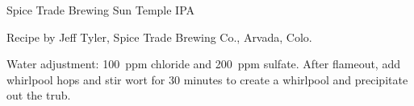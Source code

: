 \begin{recipe}{Spice Trade Brewing Sun Temple IPA}

\begin{aboutblock}
Recipe by Jeff Tyler, Spice Trade Brewing Co., Arvada, Colo.
\end{aboutblock}


\begin{methodandtiming}
 
\begin{mashsteps}
\end{mashsteps}

\begin{fermentationsteps}
\end{fermentationsteps}

\begin{directions}
Water adjustment: 100~ppm chloride and 200~ppm sulfate. After flameout,
add whirlpool hops and stir wort for 30 minutes to create a whirlpool and
precipitate out the trub.
\end{directions}

\end{methodandtiming}

\recipebreak

\begin{ingredientsblock}

\begin{malts}
\end{malts}

\begin{hops}
\end{hops}


\end{ingredientsblock}
\end{recipe}
